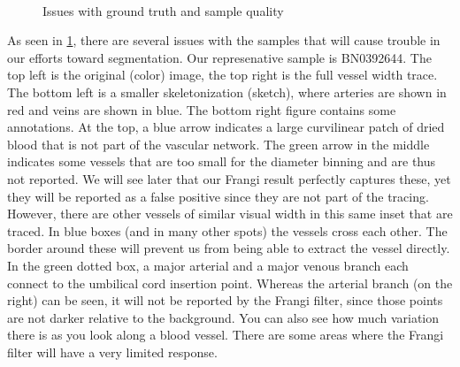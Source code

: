 \begin{figure} \centering
 \\
\caption{Issues with ground truth and sample quality}
\label{fig:groundtruth-samplequality}
\end{figure}

As seen in \cref{fig:groundtruth-samplequality}, there are several issues with the samples that will cause trouble in our efforts toward segmentation. Our represenative sample is BN0392644. The top left is the original (color) image, the top right is the full vessel width trace. The bottom left is a smaller skeletonization (sketch), where arteries are shown in red and veins are shown in blue. The bottom right figure contains some annotations. At the top, a blue arrow indicates a large curvilinear patch of dried blood that is not part of the vascular network. The green arrow in the middle indicates some vessels that are too small for the diameter binning and are thus not reported. We will see later that our Frangi result perfectly captures these, yet they will be reported as a false positive since they are not part of the tracing. However, there are other vessels of similar visual width in this same inset that are traced. In blue boxes (and in many other spots) the vessels cross each other. The border around these will prevent us from being able to extract the vessel directly. In the green dotted box, a major arterial and a major venous branch each connect to the umbilical cord insertion point. Whereas the arterial branch (on the right) can be seen, it will not be reported by the Frangi filter, since those points are not darker relative to the background. You can also see how much variation there is as you look along a blood vessel. There are some areas where the Frangi filter will have a very limited response. 



